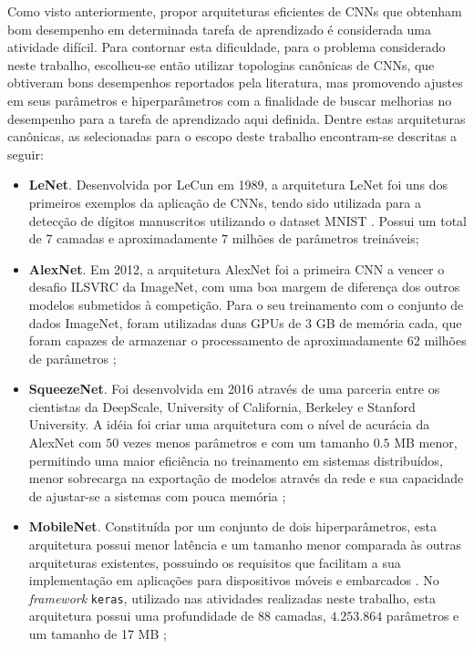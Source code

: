
Como visto anteriormente, propor arquiteturas eficientes de CNNs que obtenham bom desempenho em determinada tarefa de aprendizado é considerada uma atividade difícil. Para contornar esta dificuldade, para o problema considerado neste trabalho, escolheu-se então utilizar topologias canônicas de CNNs, que obtiveram bons desempenhos reportados pela literatura, mas promovendo ajustes em seus parâmetros e hiperparâmetros com a finalidade de buscar melhorias  no desempenho para a tarefa de aprendizado aqui definida. Dentre estas arquiteturas canônicas, as selecionadas para o escopo deste trabalho encontram-se descritas a seguir:

\begin{itemize}
	\item \textbf{LeNet}. Desenvolvida por LeCun em 1989, a arquitetura LeNet foi uns dos primeiros exemplos da aplicação de CNNs, tendo sido utilizada para a detecção de dígitos manuscritos utilizando o dataset MNIST \cite{lecun}. Possui um total de 7 camadas e aproximadamente $7$ milhões de parâmetros treináveis;
	\item \textbf{AlexNet}. Em 2012, a arquitetura AlexNet foi a primeira CNN a vencer o desafio ILSVRC da ImageNet, com uma boa margem de diferença dos outros modelos submetidos à competição. Para o seu treinamento com o conjunto de dados ImageNet, foram utilizadas duas GPUs de 3 GB de memória cada, que foram capazes de armazenar o processamento de aproximadamente 62 milhões de parâmetros \cite{alexnet,khan};
	\item \textbf{SqueezeNet}. Foi desenvolvida em 2016 através de uma parceria entre os cientistas da DeepScale, University of California, Berkeley e Stanford University. A idéia foi criar uma arquitetura com o nível de acurácia da AlexNet com $50$ vezes menos parâmetros e com um tamanho $0.5$ MB menor, permitindo uma maior eficiência no treinamento em sistemas distribuídos, menor sobrecarga na exportação de modelos através da rede e sua capacidade de ajustar-se a sistemas com pouca memória \cite{squeezenet};
	\item \textbf{MobileNet}. Constituída por um conjunto de dois hiperparâmetros, esta arquitetura possui menor latência e um tamanho menor comparada às outras arquiteturas existentes, possuindo os requisitos que facilitam a sua implementação em aplicações para dispositivos móveis e embarcados \cite{mobilenet}. No \emph{framework} \texttt{keras}, utilizado nas atividades realizadas neste trabalho, esta arquitetura possui uma profundidade de $88$ camadas, $4.253.864$ parâmetros e um tamanho de 17 MB \cite{keras};

\end{itemize}
